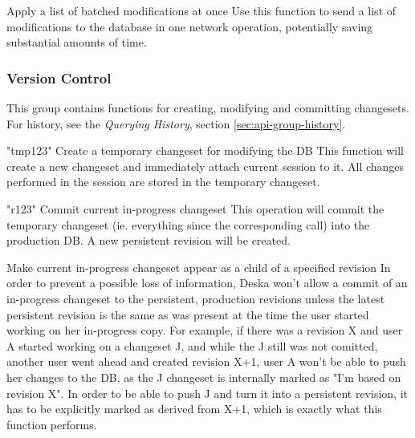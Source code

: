 \documentclass{article}
\begin{document}
    {}
    {Apply a list of batched modifications at once}
    {Use this function to send a list of modifications to the database in one network operation, potentially saving
    substantial amounts of time.}

\subsubsection{Version Control}
\label{sec:api-group-vcs}

This group contains functions for creating, modifying and committing changesets.  For history, see the {\em Querying
History}, section \ref{sec:api-group-history}.

    {"tmp123"}
    {Create a temporary changeset for modifying the DB}
    {This function will create a new changeset and immediately attach current session to it.  All changes performed in
    the session are stored in the temporary changeset.}

    {"r123"}
    {Commit current in-progress changeset}
    {This operation will commit the temporary changeset (ie. everything since the corresponding
     call) into the production DB.  A new persistent revision will be created.}

    {}
    {Make current in-progress changeset appear as a child of a specified revision}
    {In order to prevent a possible loss of information, Deska won't allow a commit of an in-progress changeset to the
    persistent, production revisions unless the latest persistent revision is the same as was present at the time the
    user started working on her in-progress copy. For example, if there was a revision X and user A started working on a
    changeset J, and while the J still was not comitted, another user went ahead and created revision X+1, user A won't
    be able to push her changes to the DB, as the J changeset is internally marked as "I'm based on revision X". In
    order to be able to push J and turn it into a persistent revision, it has to be explicitly marked as derived from
    X+1, which is exactly what this function performs.}
\end{document}
